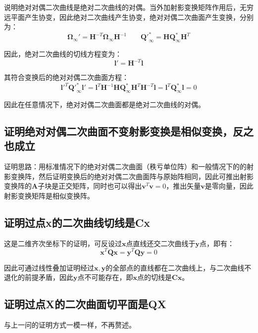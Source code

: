 \documentclass[11pt]{article}
\begin{document}
说明绝对对偶二次曲线是绝对二次曲线的对偶。当外加射影变换矩阵作用后，无穷远平面产生协变，因此绝对二次曲线产生协变，绝对对偶二次曲面产生变换，分别为：
\begin{equation*}
  \mathbold{\Omega}_\infty'=\mathbold{H}^{-T}\mathbold{\Omega}_\infty\mathbold{H}^{-1}\qquad\mathbf{Q'}_\infty^{*}=\mathbold{H}\mathbold{Q}_\infty^*\mathbold{H}^T
\end{equation*}\par
因此，绝对二次曲线的切线方程变为：
\begin{equation*}
  \mathbold{l}'=\mathbf{H}^{-T}\mathbf{l}
\end{equation*}\par
其符合变换后的绝对对偶二次曲面方程：
\begin{equation*}
  \mathbf{l'}^T\mathbf{Q'}_\infty^{*}\mathbf{l'}=\mathbf{l}^T\mathbf{H}^{-1}\mathbf{H}\mathbf{Q}_\infty^*\mathbf{H}^T\mathbf{H}^{-T}\mathbf{l}=\mathbf{l}^T\mathbf{Q}_\infty^*\mathbf{l}=0
\end{equation*}\par
因此在任意情况下，绝对对偶二次曲面都是绝对二次曲线的对偶。
\subsection{证明绝对对偶二次曲面不变射影变换是相似变换，反之也成立}
证明思路：用标准情况下的绝对对偶二次曲面（秩亏单位阵）和一般情况下的的射影变换阵，然后证明变换后的绝对对偶二次曲面阵与原始阵相同，因此可推出射影变换阵的$\mathbf{A}$子块是正交矩阵，同时也可以得出$\mathbf{v}^T\mathbf{v}=0$，推出矢量$\mathbf{v}$是零向量，因此射影变换矩阵是相似变换阵。
\subsection{证明过点x的二次曲线切线是Cx}
这是二维齐次坐标下的证明，可反设过$\mathbf{x}$点直线还交二次曲线于$\mathbf{y}$点，即有：
\begin{equation*}
  \mathbf{x}^T\mathbf{Qx}=\mathbf{y}^T\mathbf{Qy}=0
\end{equation*}\par
因此可通过线性叠加证明经过$\mathbf{x,y}$的全部点的直线都在二次曲线上，与二次曲线不退化的前提矛盾，因此$\mathbf{y}$点不可能存在，即$\mathbf{x}$点的切线是$\mathbf{Cx}$。
\subsection{证明过点X的二次曲面切平面是QX}
与上一问的证明方式一模一样，不再赘述。
\end{document}
